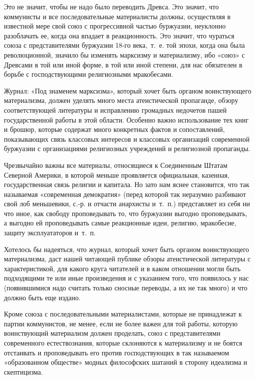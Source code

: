 \documentclass[twoside]{article}
\begin{document}
Это не значит, чтобы не надо было переводить Древса. Это значит, что
коммунисты и все последовательные материалисты должны, осуществляя в
известной мере свой союз с прогрессивной частью буржуазии, неуклонно
разоблачать ее, когда она впадает в реакционность. Это значит, что чураться
союза с представителями буржуазии 18-го века,~т.~е. той эпохи, когда она
была революционной, значило бы изменять марксизму и материализму, ибо
«союз» с Древсами в той или иной форме, в той или иной степени, для нас
обязателен в борьбе с господствующими религиозными мракобесами.

Журнал: «Под знаменем марксизма», который хочет быть органом воинствующего
материализма, должен уделять много места атеистической пропаганде, обзору
соответствующей литературы и исправлению громадных недочетов пашей
государственной работы в этой области. Особенно важно использование тех
книг и брошюр, которые содержат много конкретных фактов и сопоставлений,
показывающих связь классовых интересов и классовых организаций современной
буржуазии с организациями религиозных учреждений и религиозной пропаганды.

Чрезвычайно важны все материалы, относящиеся к Соединенным Штатам Северной
Америки, в которой меньше проявляется официальная, казенная,
государственная связь религии и капитала. Но зато нам яснее становится, что
так называемая «современная демократия» (перед которой так неразумно
разбивают свой лоб меньшевики, с.-р. и отчасти анархисты и~т.~п.)
представляет из себя ни что иное, как свободу проповедывать то, что
буржуазии выгодно проповедывать, а выгодно ей проповедывать самые
реакционные идеи, религию, мракобесие, защиту эксплуататоров и~т.~п.

Хотелось бы надеяться, что журнал, который хочет быть органом воинствующего
материализма, даст нашей читающей публике обзоры атеистической литературы с
характеристикой, для какого круга читателей и в каком отношении могли быть
подходящими те или иные произведения и с указанием того, что появилось у
нас (появившимися надо считать только сносные переводы, а их не так много)
и что должно быть еще издано.

Кроме союза с последовательными материалистами, которые не принадлежат к
партии коммунистов, не менее, если не более важен для той работы, которую
воинствующий материализм должен проделать, союз с представителями
современного естествознания, которые склоняются к материализму и не боятся
отстаивать и проповедывать его против господствующих в так называемом
«образованном обществе» модных философских шатаний в сторону идеализма и
скептицизма.
\end{document}
